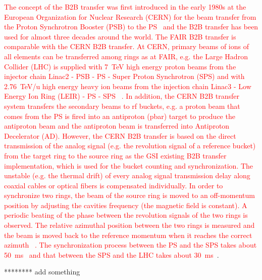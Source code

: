 \textcolor{red}{The concept of the B2B transfer was first introduced in the early 1980s at the European Organization for Nuclear Research (CERN) for the beam transfer from the Proton Synchrotron Booster (PSB) to the PS~\cite{garoby_cern-ps-rf-note-84-6_1984} and the B2B transfer has been used for almost three decades around the world. The FAIR B2B transfer is comparable with the CERN B2B transfer. At CERN, primary beams of ions of all elements can be transferred among rings as at FAIR, e.g. the Large Hadron Collider (LHC) is supplied with \SI{7}{TeV} high energy proton beams from the injector chain Linac2 - PSB - PS -  Super Proton Synchrotron (SPS) and with \SI{2.76}{TeV/u} high energy heavy ion beams from the injection chain Linac3 - Low Energy Ion Ring (LEIR) - PS - SPS  ~\cite{noauthor_cern_nodate}. In addition, the CERN B2B transfer system transfers the secondary beams to rf buckets, e.g. a proton beam that comes from the PS is fired into an antiproton (pbar) target to produce the antiproton beam and the antiproton beam is transferred into Antiproton Decelerator (AD). However, the CERN B2B transfer is based on the direct transmission of the analog signal (e.g. the revolution signal of a reference bucket) from the target ring to the source ring as the GSI existing B2B transfer implementation, which is used for the bucket counting and synchronization. The unstable (e.g. the thermal drift) of every analog signal transmission delay along coaxial cables or optical fibers is compensated individually. In order to synchronize two rings, the beam of the source ring is moved to an off-momentum position by adjusting the cavities frequency (the magnetic field is constant). A periodic beating of the phase between the revolution signals of the two rings is observed. The relative azimuthal position between the two rings is measured and the beam is moved back to the reference momentum when it reaches the correct azimuth ~\cite{damerau_lecture_2017}. The synchronization process between the PS and the SPS takes about \SI{50}{\ms}~\cite{ferrand_cern-acc-note-2015-0025_2015} and that between the SPS and the LHC takes about \SI{30}{\ms}~\cite{baudrenghien_sps_1998}}. 

******** add something



